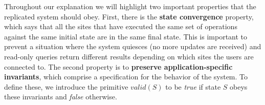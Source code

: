 Throughout our explanation we will highlight two important properties
that the replicated system should obey. First, there is
the {\bf state convergence} property, which says that all the sites
that have executed the same set of operations against the same initial state are in the same final state.
This is important to prevent a situation where
the system quiesces (no more updates are received) and
read-only queries return different results
depending on which sites the users are connected to.
The second property is to {\bf preserve application-specific invariants}, which comprise a specification for the behavior of the system.
To define these, we introduce the primitive $\textit{valid}(S)$ to be {\it
  true} if state $S$ obeys these invariants and {\it false}
otherwise. 

